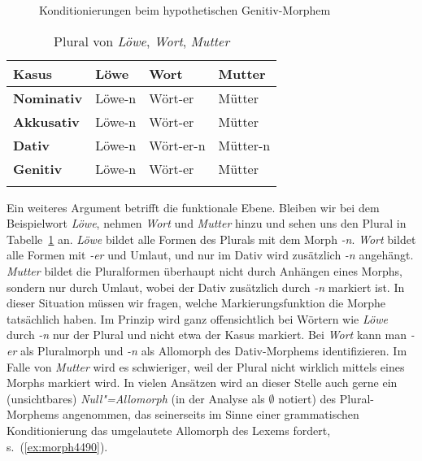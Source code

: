 \begin{figure}
  \centering
  \caption{Konditionierungen beim hypothetischen Genitiv-Morphem}
  \label{fig:kondgensg}
\end{figure}

\begin{table}
  \begin{tabular}{llll}
	\lsptoprule
    \textbf{Kasus} & \textbf{Löwe} & \textbf{Wort} & \textbf{Mutter} \\
    \midrule
     \textbf{Nominativ} & Löwe-n & Wört-er   & Mütter   \\
     \textbf{Akkusativ} & Löwe-n & Wört-er   & Mütter   \\
     \textbf{Dativ}     & Löwe-n & Wört-er-n & Mütter-n \\
     \textbf{Genitiv}   & Löwe-n & Wört-er   & Mütter   \\
    \lspbottomrule
  \end{tabular}
  \caption{Plural von \textit{Löwe}, \textit{Wort}, \textit{Mutter}}
  \label{tab:pluralbeispielmorpheme}
\end{table}

Ein weiteres Argument betrifft die funktionale Ebene.
Bleiben wir bei dem Beispielwort \textit{Löwe}, nehmen \textit{Wort} und \textit{Mutter} hinzu und sehen uns den Plural in Tabelle~\ref{tab:pluralbeispielmorpheme} an.
\textit{Löwe} bildet alle Formen des Plurals mit dem Morph \textit{-n}.
\textit{Wort} bildet alle Formen mit \textit{-er} und Umlaut, und nur im Dativ wird zusätzlich \textit{-n} angehängt.
\textit{Mutter} bildet die Pluralformen überhaupt nicht durch Anhängen eines Morphs, sondern nur durch Umlaut, wobei der Dativ zusätzlich durch \textit{-n} markiert ist.
In dieser Situation müssen wir fragen, welche Markierungsfunktion die Morphe tatsächlich haben.
Im Prinzip wird ganz offensichtlich bei Wörtern wie \textit{Löwe} durch \textit{-n} nur der Plural und nicht etwa der Kasus markiert.
Bei \textit{Wort} kann man \textit{-er} als Pluralmorph und \textit{-n} als Allomorph des Dativ-Morphems identifizieren.
Im Falle von \textit{Mutter} wird es schwieriger, weil der Plural nicht wirklich mittels eines Morphs markiert wird.
In vielen Ansätzen wird an dieser Stelle auch gerne ein (unsichtbares) \textit{Null"=Allomorph} (in der Analyse \zB als $\emptyset$ notiert) des Plural-Morphems angenommen, das seinerseits im Sinne einer grammatischen Konditionierung das umgelautete Allomorph des Lexems fordert, s.\ (\ref{ex:morph4490}).

